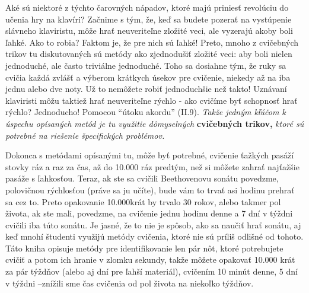 Aké sú niektoré z týchto čarovných nápadov, ktoré majú priniesť revolúciu do učenia hry na klavíri? Začnime s tým, že, keď sa budete pozerať na vystúpenie slávneho klaviristu, môže hrať neuveriteľne zložité veci, ale vyzerajú akoby boli ľahké. Ako to robia? Faktom je, že pre nich sú ľahké! Preto, mnoho z cvičebných trikov tu diskutovaných sú metódy ako zjednodušiť zložité veci: aby boli nielen jednoduché, ale často triviálne jednoduché. Toho sa dosiahne tým, že ruky sa cvičia každá zvlášť a výberom krátkych úsekov pre cvičenie, niekedy až na iba jednu alebo dve noty. Už to nemôžete robiť jednoduchšie než takto! Uznávaní klaviristi môžu taktiež hrať neuveriteľne rýchlo - ako cvičíme byť schopnosť hrať rýchlo? Jednoducho! Pomocou “útoku akordu” (II.9). \emph{Takže jedným kľúčom k úspechu opísaných metód je tu využitie dômyselných} \textbf{cvičebných trikov,} \emph{ktoré sú potrebné na riešenie špecifických problémov.}

Dokonca s metódami opísanými tu, môže byť potrebné, cvičenie ťažkých pasáží stovky ráz a raz za čas, až do 10.000 ráz predtým, než si môžete zahrať najťažšie pasáže s ľahkosťou. Teraz, ak ste sa cvičili Beethovenovu sonátu povedzme, polovičnou rýchlosťou (práve sa ju učíte), bude vám to trvať asi hodinu prehrať sa cez to. Preto opakovanie 10.000krát by trvalo 30 rokov, alebo takmer pol života, ak ste mali, povedzme, na cvičenie jednu hodinu denne a 7 dní v týždni cvičili iba túto sonátu. Je jasné, že to nie je spôsob, ako sa naučiť hrať sonátu, aj keď mnohí študenti využijú metódy cvičenia, ktoré nie sú príliš odlišné od tohoto. Táto kniha opisuje metódy pre identifikovanie len pár nôt, ktoré potrebujete cvičiť  a potom ich hranie v zlomku sekundy, takže môžete opakovať 10.000 krát za pár týždňov (alebo aj dní pre ľahší materiál), cvičením 10 minút denne, 5 dní v týždni –znížili sme čas cvičenia od pol života na niekoľko týždňov.

